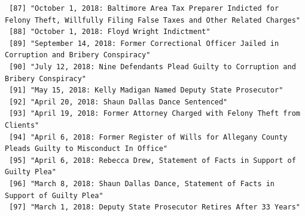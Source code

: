 \documentclass[
  letterpaper,
  DIV=11,
  numbers=noendperiod]{scrreprt}
\begin{document}
\begin{verbatim}
 [87] "October 1, 2018: Baltimore Area Tax Preparer Indicted for Felony Theft, Willfully Filing False Taxes and Other Related Charges"                                                                                                                      
 [88] "October 1, 2018: Floyd Wright Indictment"                                                                                                                                                                                                            
 [89] "September 14, 2018: Former Correctional Officer Jailed in Corruption and Bribery Conspiracy"                                                                                                                                                         
 [90] "July 12, 2018: Nine Defendants Plead Guilty to Corruption and Bribery Conspiracy"                                                                                                                                                                    
 [91] "May 15, 2018: Kelly Madigan Named Deputy State Prosecutor"                                                                                                                                                                                           
 [92] "April 20, 2018: Shaun Dallas Dance Sentenced"                                                                                                                                                                                                        
 [93] "April 19, 2018: Former Attorney Charged with Felony Theft from Clients"                                                                                                                                                                              
 [94] "April 6, 2018: Former Register of Wills for Allegany County Pleads Guilty to Misconduct In Office"                                                                                                                                                   
 [95] "April 6, 2018: Rebecca Drew, Statement of Facts in Support of Guilty Plea"                                                                                                                                                                           
 [96] "March 8, 2018: Shaun Dallas Dance, Statement of Facts in Support of Guilty Plea"                                                                                                                                                                     
 [97] "March 1, 2018: Deputy State Prosecutor Retires After 33 Years"                                                                                                                                                                                       

\end{verbatim}
\end{document}
